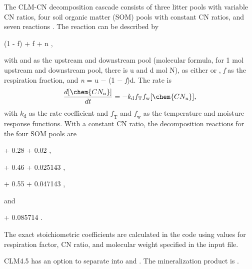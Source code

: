\documentclass[gmd, manuscript]{copernicus}
\begin{document}
The CLM-CN decomposition cascade consists of three litter pools with variable
CN ratios, four soil organic matter (SOM) pools with constant CN ratios, and
seven reactions \citep{Bonan2012,Oleson2013,Thornton2005}. The reaction can be
described by
\begin{reaction}
 \rightarrow (1 - f)  + f  + n ,
\label{rxn:decomp}
\end{reaction}
with  and  as the upstream and downstream pool (molecular
formula, for 1 mol upstream and downstream pool, there is u and d mol N),
 as either  or , \textit{f} as the
respiration fraction, and \textit{n} = u $-$ (1 $-$ \textit{f})d. The rate is
\begin{equation}
\frac{d [\chem{CN_u}]}{d t} = - k_\text{d} f_\text{T} f_\text{w} [\chem{CN_u}],
\label{eq:decomprate}
\end{equation}
with $\textit{k}_\text{d}$ as the rate coefficient and $\textit{f}_\text{T}$
and $\textit{f}_\text{w}$ as the temperature and moisture response functions.
With a constant CN ratio, the decomposition reactions for the four SOM pools are 
\begin{reaction}
   + 0.28  + 0.02 ,
\label{rxn:som1}
\end{reaction}
\begin{reaction}
   + 0.46  + 0.025143 ,
\label{rxn:som2}
\end{reaction}
\begin{reaction}
   + 0.55  + 0.047143 ,
\label{rxn:som3}
\end{reaction}
and
\begin{reaction}
 \rightarrow {} + 0.085714 .
\label{rxn:som4}
\end{reaction}
The exact stoichiometric coefficients are calculated in the code using values
for respiration factor, CN ratio, and molecular weight specified in the input
file.

CLM4.5 has an option to separate  into  and .
The  mineralization product is .
\end{document}
